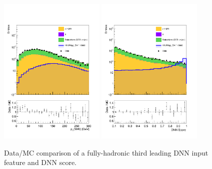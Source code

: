 \begin{figure}[!htbp]
  \centering
  \includegraphics[width=0.45\textwidth]{Images/DataMC/DataMC_New_pTBasedSel_WW_pT_SB_log.pdf}%
  \includegraphics[width=0.45\textwidth]{Images/DataMC/DataMC_evalDNN_WWvsAll_SB_log.pdf}%
  \caption{Data/MC comparison of a fully-hadronic third leading DNN input feature and DNN score.}
\label{fig:FH_DataMC_2}
\end{figure}
